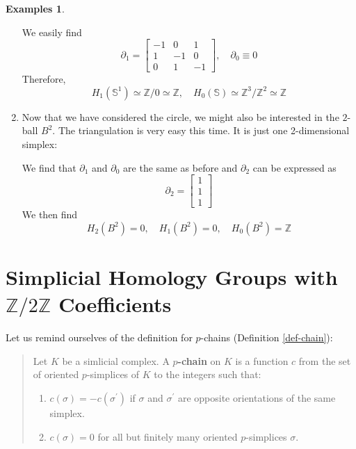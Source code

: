 \documentclass[draft]{scrartcl}
\theoremstyle{plain}
\theoremstyle{definition}
\newtheorem{examples}[theorem]{Examples}
\theoremstyle{remark}
\newcommand{\SH}{Simplicial Homology}
\newcommand{\Z}{\mathbb{Z}}
\newcommand{\Sp}{\mathbb{S}}
\begin{document}
\begin{examples}
\begin{enumerate}
We easily find 
\[
\partial_1=\begin{bmatrix}
-1&0&1\\1&-1&0\\0&1&-1
\end{bmatrix},\quad \partial_0\equiv 0
\]
Therefore,
\[H_1(\Sp^1)\simeq\Z/0\simeq\Z,\quad H_0(\Sp)\simeq\Z^3/\Z^2\simeq\Z
\]
\item 
Now that we have considered the circle, we might also be interested in the $2$-ball $B^2$. The triangulation is very easy this time. It is just one 2-dimensional simplex:
\begin{center}

We find that $\partial_1$ and $\partial_0$ are the same as before and $\partial_2$ can be expressed as
\[
\partial_2=\begin{bmatrix}
1\\1\\1
\end{bmatrix}
\]
We then find
\[
H_2(B^2)=0,\quad H_1(B^2)=0,\quad H_0(B^2)=\Z
\]

\end{center}
	\end{enumerate}
\end{examples}


\section{\SH{} Groups with $\mathbb{Z}/2\mathbb{Z}$ Coefficients}

Let us remind ourselves of the definition for $p$-chains (Definition \ref{def-chain}):
\begin{quotation}
	Let $K$ be a simlicial complex. A \textbf{$p$-chain} on $K$ is a function $c$ from the set of oriented $p$-simplices of $K$ to the integers such that:
	\begin{enumerate}
		\item $c(\sigma)=-c(\sigma^\prime)$ if $\sigma$ and $\sigma^\prime$ are opposite orientations of the same simplex.
		\item $c(\sigma)=0$ for all but finitely many oriented $p$-simplices $\sigma$.
	\end{enumerate}
\end{quotation}
\end{document}
